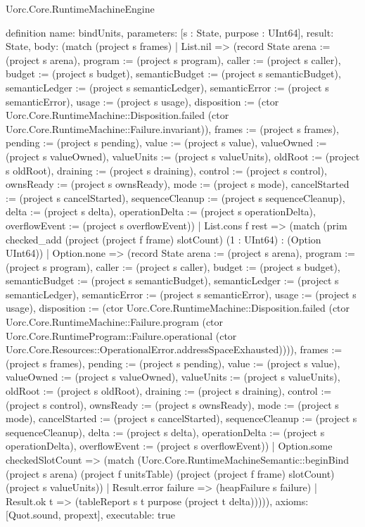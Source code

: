 \begin{lexlean}{Uorc.Core.RuntimeMachineEngine}
\begin{semanticmodule}
definition{
  name: bindUnits,
  parameters: [s : State, purpose : UInt64],
  result: State,
  body: (match (project s frames)
    | List.nil => (record State {arena := (project s arena), program := (project s program), caller := (project s caller), budget := (project s budget), semanticBudget := (project s semanticBudget), semanticLedger := (project s semanticLedger), semanticError := (project s semanticError), usage := (project s usage), disposition := (ctor Uorc.Core.RuntimeMachine::Disposition.failed (ctor Uorc.Core.RuntimeMachine::Failure.invariant)), frames := (project s frames), pending := (project s pending), value := (project s value), valueOwned := (project s valueOwned), valueUnits := (project s valueUnits), oldRoot := (project s oldRoot), draining := (project s draining), control := (project s control), ownsReady := (project s ownsReady), mode := (project s mode), cancelStarted := (project s cancelStarted), sequenceCleanup := (project s sequenceCleanup), delta := (project s delta), operationDelta := (project s operationDelta), overflowEvent := (project s overflowEvent)})
    | List.cons f rest => (match (prim checked_add (project (project f frame) slotCount) (1 : UInt64) : (Option UInt64))
      | Option.none => (record State {arena := (project s arena), program := (project s program), caller := (project s caller), budget := (project s budget), semanticBudget := (project s semanticBudget), semanticLedger := (project s semanticLedger), semanticError := (project s semanticError), usage := (project s usage), disposition := (ctor Uorc.Core.RuntimeMachine::Disposition.failed (ctor Uorc.Core.RuntimeMachine::Failure.program (ctor Uorc.Core.RuntimeProgram::Failure.operational (ctor Uorc.Core.Resources::OperationalError.addressSpaceExhausted)))), frames := (project s frames), pending := (project s pending), value := (project s value), valueOwned := (project s valueOwned), valueUnits := (project s valueUnits), oldRoot := (project s oldRoot), draining := (project s draining), control := (project s control), ownsReady := (project s ownsReady), mode := (project s mode), cancelStarted := (project s cancelStarted), sequenceCleanup := (project s sequenceCleanup), delta := (project s delta), operationDelta := (project s operationDelta), overflowEvent := (project s overflowEvent)})
      | Option.some checkedSlotCount => (match (Uorc.Core.RuntimeMachineSemantic::beginBind (project s arena) (project f unitsTable) (project (project f frame) slotCount) (project s valueUnits))
        | Result.error failure => (heapFailure s failure)
        | Result.ok t => (tableReport s t purpose (project t delta))))),
  axioms: [Quot.sound, propext],
  executable: true
}


\end{semanticmodule}
\end{lexlean}
